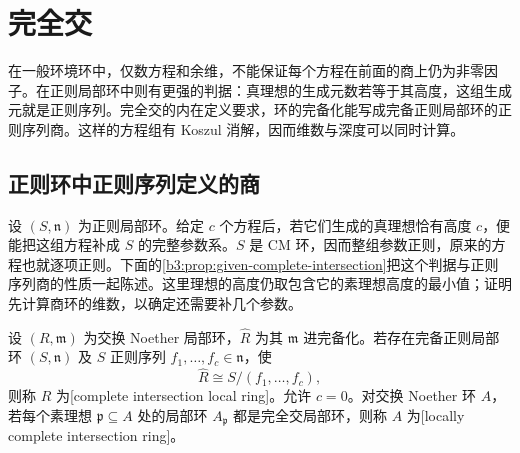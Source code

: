 
\section{完全交}
\label{b3:sec:1903}

在一般环境环中，仅数方程和余维，不能保证每个方程在前面的商上仍为非零因子。在正则局部环中则有更强的判据：真理想的生成元数若等于其高度，这组生成元就是正则序列。完全交的内在定义要求，环的完备化能写成完备正则局部环的正则序列商。这样的方程组有 Koszul 消解，因而维数与深度可以同时计算。


%
%

\subsection{正则环中正则序列定义的商}
\label{b3:subsec:1903:01}

设 \((S,\mathfrak n)\) 为正则局部环。给定 \(c\) 个方程后，若它们生成的真理想恰有高度 \(c\)，便能把这组方程补成 \(S\) 的完整参数系。\(S\) 是 CM 环，因而整组参数正则，原来的方程也就逐项正则。下面的\cref{b3:prop:given-complete-intersection}把这个判据与正则序列商的性质一起陈述。这里理想的高度仍取包含它的素理想高度的最小值；证明先计算商环的维数，以确定还需要补几个参数。

\begin{definition}\label{b3:def:local-complete-intersection}
	设 \((R,\mathfrak m)\) 为交换 Noether 局部环，\(\widehat R\) 为其 \(\mathfrak m\) 进完备化。若存在完备正则局部环 \((S,\mathfrak n)\) 及 \(S\) 正则序列 \(f_1,\ldots,f_c\in\mathfrak n\)，使
	\[
		\widehat R\cong S/(f_1,\ldots,f_c),
	\]
	则称 \(R\) 为[complete intersection local ring]。允许 \(c=0\)。对交换 Noether 环 \(A\)，若每个素理想 \(\mathfrak p\subseteq A\) 处的局部环 \(A_{\mathfrak p}\) 都是完全交局部环，则称 \(A\) 为[locally complete intersection ring]。
\end{definition}

